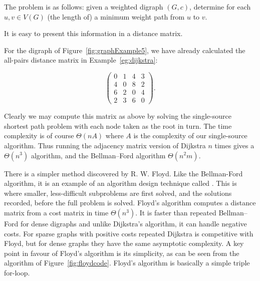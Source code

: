 The problem is as follows: given a weighted digraph $(G, c)$, determine
for each $u, v\in V(G)$ (the length of) a minimum weight path from $u$
to $v$.

It is easy to present this information in a distance matrix.

\begin{Example}
\label{eg:APSP}
For the digraph of Figure~\ref{fig:graphExample5}, we have already
calculated the all-pairs distance matrix in Example~\ref{eg:dijkstra}:

$$
\left(
\begin{matrix}
0 & 1 & 4 & 3 \\
4 & 0 & 8 & 2 \\
6 & 2 & 0 & 4 \\
2 & 3 & 6 & 0
\end{matrix}
\right).
$$
\end{Example}

Clearly we may compute this matrix as above by solving the single-source
shortest path problem with each node taken as the root in turn. The time
complexity is of course $\Theta(nA)$ where $A$ is the complexity of our
single-source algorithm. Thus running the adjacency matrix version of
Dijkstra $n$ times gives a $\Theta(n^3)$ algorithm, and the 
Bellman--Ford algorithm $\Theta(n^2 m)$.

There is a simpler method discovered by R. W. Floyd. Like the Bellman-Ford 
algorithm, it is an example of an algorithm design technique called 
.
This is where smaller, less-difficult subproblems are first solved, and the 
solutions recorded, before
the full problem is solved. Floyd's algorithm computes a distance matrix
from a cost matrix in time $\Theta(n^3)$. It is faster than repeated
Bellman--Ford for dense digraphs and unlike Dijkstra's algorithm,
it can handle negative costs. For sparse graphs with positive costs
repeated Dijkstra is competitive with Floyd, but for dense graphs they
have the same asymptotic complexity. A key point in favour of Floyd's
algorithm is its simplicity, as can be seen from the algorithm of
Figure~\ref{fig:floydcode}. Floyd's algorithm is basically a simple
triple for-loop.

